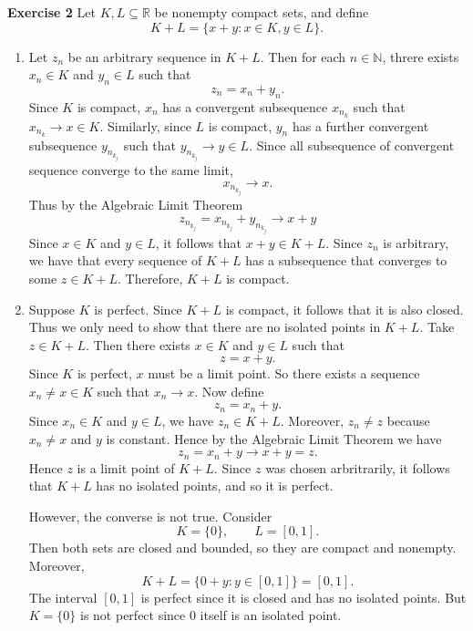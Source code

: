 \documentclass[12pt]{article}
\begin{document}
\textbf{Exercise 2}
Let \( K, L \subseteq \mathbb{R} \) be nonempty compact sets, and define
\[
    K + L = \{x + y : x \in K, y \in L \}.
\]
\begin{enumerate}[label=(\alph*)]
    \item Let \( z_n \) be an arbitrary sequence in \( K +L \). Then for each \( n \in \mathbb{N} \), threre exists \( x_n \in K \) and \( y_n \in L \) such that
          \[
              z_n = x_n + y_n.
          \]
          Since \( K \) is compact, \( x_n \) has a convergent
          subsequence \( x_{n_k} \) such that \( x_{n_k} \to  x \in K\).
          Similarly, since \( L \) is compact, \( y_n \) has a further convergent subsequence \( y_{n_{k_j}} \) such that \( y_{n_{k_j}} \to y \in L \).
          Since all subsequence of convergent sequence converge to the same limit,
          \[
              x_{n_{k_j}} \to x .
          \]
          Thus by the Algebraic Limit Theorem
          \[
              z_{n_{k_j}} = x_{n_{k_j}} + y_{n_{k_j}} \to x + y
          \]
          Since \( x \in K \) and \( y \in L \), it follows that \( x + y \in K + L \). Since \( z_n \) is arbitrary, we have that every sequence of \( K+L \) has a subsequence that converges to some \( z \in K+L \). Therefore, \( K + L \) is compact.


    \item Suppose \( K \) is perfect. Since \( K + L \) is compact, it follows that it is also closed. Thus we only need to show that there are no isolated points in \( K + L \). Take \( z \in K + L \). Then there exists \( x \in K \) and \( y \in L \) such that
          \[
              z = x + y.
          \]
          Since \( K  \) is perfect, \( x \) must be a limit point. So there exists a sequence \( x_n \neq x \in K \) such that \( x_n \to x \). Now define
          \[
              z_n = x_n + y.
          \]
          Since \( x_n \in K \) and \(  y \in L \), we have \( z_n \in K + L \). Moreover, \( z_n \neq z \) because \( x_n \neq x \) and \( y \) is constant.
          Hence by the Algebraic Limit Theorem we have
          \[
              z_n = x_n + y \to x + y = z.
          \]
          Hence \( z \) is a limit point of \( K + L \). Since \( z \) was chosen arbritrarily, it follows that \( K + L \) has no isolated points, and so it is perfect.

          However, the converse is not true. Consider
          \[
              K = \{0\}, \qquad L = [0,1].
          \]
          Then both sets are closed and bounded, so they are compact and nonempty.
          Moreover,
          \[
              K + L = \{0 + y: y \in [0,1]\} = [0,1].
          \]
          The interval \( [0,1] \) is perfect since it is closed and has no isolated points. But \( K = \{0\} \) is not perfect since 0 itself is an isolated point.
\end{enumerate}
\end{document}
